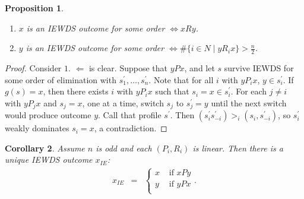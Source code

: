 \documentclass[12pt]{article}
\newtheorem{propo}{Proposition}[section]
\newtheorem{coro}[propo]{Corollary}
\newcommand{\n}{\noindent}
\newcommand{\s}{\vspace{5mm}}
\begin{document}
\s
\n\begin{propo}\mbox{}
\begin{enumerate}
\item $x$ is an IEWDS outcome for some order $\Longleftrightarrow xRy$.
\item $y$ is an IEWDS outcome for some order $\Longleftrightarrow \#\{i\in N\mid yR_ix\}>\frac{n}{2}$.
\end{enumerate}
\end{propo}
\begin{proof}  Consider $1$.  $\Leftarrow$ is clear.  Suppose that $yPx$, and let $s$ survive IEWDS for some order of elimination with $s_1^{\prime},\hdots,s_n^{\prime}$.  Note that for all $i$ with $yP_ix$, $y\in s_i^{\prime}$.  If $g(s)=x$, then there exists $i$ with $yP_ix$ such that $s_i=x\in s_i^{\prime}$.  For each $j\neq i$ with $yP_jx$ and $s_j=x$, one at a time, switch $s_j$ to $s_j^{\prime}=y$ until the next switch would produce outcome $y$.  Call that profile $s^{\prime}$.  Then $(s_i^{\prime}s_{-i}^{\prime})>_i(s_i,s_{-i}^{\prime})$, so $s_i^{\prime}$ weakly dominates $s_i=x$, a contradiction.
\end{proof}




\s
\n\begin{coro}  Assume $n$ is odd and each $(P_i,R_i)$ is linear.  Then there is a unique IEWDS outcome $x_{IE}$:
\begin{eqnarray*}
x_{IE}&=&\left\{\begin{array}{cc}
x&\mbox{ if }xPy\\
y&\mbox{ if }yPx\\
\end{array}\right..
\end{eqnarray*}
\end{coro}
\end{document}
